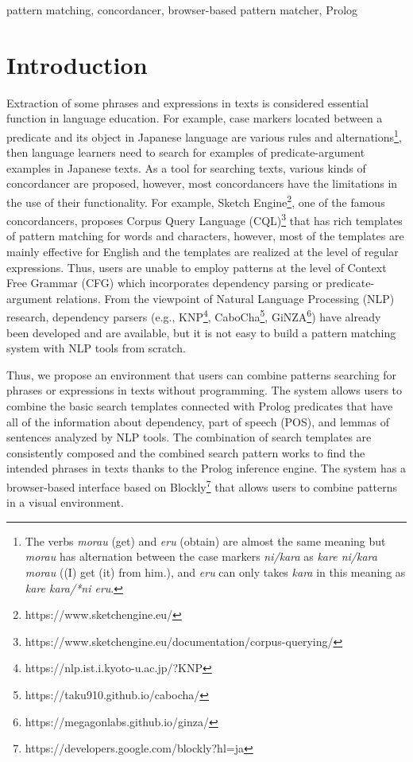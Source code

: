 \documentclass[conference]{IEEEtran}
\begin{document}
\begin{IEEEkeywords}
  pattern matching, concordancer, browser-based pattern matcher, Prolog
\end{IEEEkeywords}

\section{Introduction}
Extraction of some phrases and expressions in texts is considered essential function in language education.
For example, case markers located between a predicate and its object in Japanese language are various
rules and alternations\footnote{The verbs {\it morau} (get) and {\it eru} (obtain) are almost the same meaning
but {\it morau} has alternation between the case markers {\it ni/kara} as {\it kare ni/kara morau}
((I) get (it) from him.), and 
{\it eru} can only takes {\it kara} in this meaning as {\it kare kara/*ni eru}.},
then language learners need to search for examples of predicate-argument
examples in Japanese texts. 
As a tool for searching texts, various kinds of concordancer are proposed, however, 
most concordancers have the limitations in the use of their functionality.
For example, Sketch Engine\footnote{https://www.sketchengine.eu/}, one of the famous concordancers,
proposes Corpus Query Language (CQL)\footnote{https://www.sketchengine.eu/documentation/corpus-querying/}
that has rich templates of pattern matching for words and characters, however, 
most of the templates are mainly effective for English and the templates are realized 
at the level of regular expressions. Thus, users are unable to employ patterns at the level of Context
Free Grammar (CFG) which incorporates dependency parsing or predicate-argument relations.
From the viewpoint of Natural Language Processing (NLP) research,
dependency parsers (e.g., KNP\footnote{https://nlp.ist.i.kyoto-u.ac.jp/?KNP}, CaboCha\footnote{https://taku910.github.io/cabocha/}, GiNZA\footnote{https://megagonlabs.github.io/ginza/}) have already been developed and are available, but it is not easy to
build a pattern matching system with NLP tools from scratch. 

Thus, we propose an environment that users can combine patterns
searching for phrases or expressions in texts without programming.
The system allows users to combine the basic search templates
connected with Prolog predicates that have all of the information
about dependency, part of speech (POS), and lemmas of sentences analyzed by NLP tools. 
The combination of search templates are consistently composed and the
combined search pattern works to find the intended phrases in texts thanks to
the Prolog inference engine. 
The system has a browser-based interface based on Blockly\footnote{https://developers.google.com/blockly?hl=ja}
that allows users to combine patterns in a visual environment. 
\end{document}
